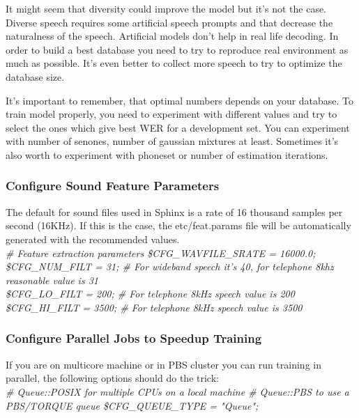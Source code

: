 \documentclass[12pt,a4paper,oneside]{memoir}
\begin{document}
It might seem that diversity could improve the model but it's not the case. Diverse speech requires some artificial speech prompts and that decrease the naturalness of the speech. Artificial models don't help in real life decoding. In order to build a best database you need to try to reproduce real environment as much as possible. It's even better to collect more speech to try to optimize the database size.

It's important to remember, that optimal numbers depends on your database. To train model properly, you need to experiment with different values and try to select the ones which give best WER for a development set. You can experiment with number of senones, number of gaussian mixtures at least. Sometimes it's also worth to experiment with phoneset or number of estimation iterations. 

\subsubsection{Configure Sound Feature Parameters}
The default for sound files used in Sphinx is a rate of 16 thousand samples per second (16KHz). If this is the case, the etc/feat.params file will be automatically generated with the recommended values. \\
\textit{
\# Feature extraction parameters
\$CFG\_WAVFILE\_SRATE = 16000.0;\\
\$CFG\_NUM\_FILT = 31; \# For wideband speech it's 40, for telephone 8khz reasonable value is 31\\
\$CFG\_LO\_FILT = 200; \# For telephone 8kHz speech value is 200\\
\$CFG\_HI\_FILT = 3500; \# For telephone 8kHz speech value is 3500\\
}

\subsubsection{Configure Parallel Jobs to Speedup Training}
If you are on multicore machine or in PBS cluster you can run training in parallel, the following options should do the trick: \\
\textit{
\# Queue::POSIX for multiple CPUs on a local machine
\# Queue::PBS to use a PBS/TORQUE queue
\$CFG\_QUEUE\_TYPE = "Queue";
}
\end{document}
